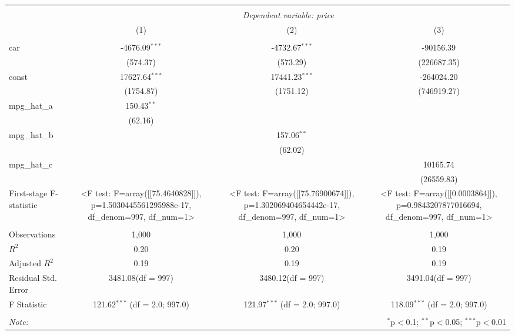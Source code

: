 \begin{table}[!htbp] \centering
\begin{tabular}{@{\extracolsep{5pt}}lccc}
\\[-1.8ex]\hline
\hline \\[-1.8ex]
& \multicolumn{3}{c}{\textit{Dependent variable: price}} \
\cr \cline{3-4}
\\[-1.8ex] & (1) & (2) & (3) \\
\hline \\[-1.8ex]
 car & -4676.09$^{***}$ & -4732.67$^{***}$ & -90156.39$^{}$ \\
  & (574.37) & (573.29) & (226687.35) \\
 const & 17627.64$^{***}$ & 17441.23$^{***}$ & -264024.20$^{}$ \\
  & (1754.87) & (1751.12) & (746919.27) \\
 mpg_hat_a & 150.43$^{**}$ & & \\
  & (62.16) & & \\
 mpg_hat_b & & 157.06$^{**}$ & \\
  & & (62.02) & \\
 mpg_hat_c & & & 10165.74$^{}$ \\
  & & & (26559.83) \\
 First-stage F-statistic & <F test: F=array([[75.4640828]]), p=1.5030445561295988e-17, df_denom=997, df_num=1> & <F test: F=array([[75.76900674]]), p=1.302069404654442e-17, df_denom=997, df_num=1> & <F test: F=array([[0.0003864]]), p=0.9843207877016694, df_denom=997, df_num=1> \\
\hline \\[-1.8ex]
 Observations & 1,000 & 1,000 & 1,000 \\
 $R^2$ & 0.20 & 0.20 & 0.19 \\
 Adjusted $R^2$ & 0.19 & 0.19 & 0.19 \\
 Residual Std. Error & 3481.08(df = 997) & 3480.12(df = 997) & 3491.04(df = 997)  \\
 F Statistic & 121.62$^{***}$ (df = 2.0; 997.0) & 121.97$^{***}$ (df = 2.0; 997.0) & 118.09$^{***}$ (df = 2.0; 997.0) \\
\hline
\hline \\[-1.8ex]
\textit{Note:} & \multicolumn{3}{r}{$^{*}$p$<$0.1; $^{**}$p$<$0.05; $^{***}$p$<$0.01} \\
\end{tabular}
\end{table}